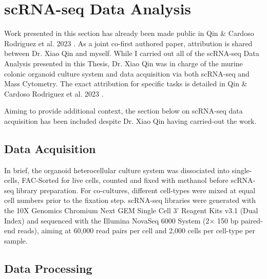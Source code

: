 \newpage
\section{scRNA-seq Data Analysis}

Work presented in this section has already been made public in Qin \& Cardoso Rodriguez et al. 2023 \cite{cardoso_rodriguez_single-cell_2023}. As a joint co-first authored paper, attribution is shared between Dr. Xiao Qin and myself. While I carried out all of the scRNA-seq Data Analysis presented in this Thesis, Dr. Xiao Qin was in charge of the murine colonic organoid culture system and data acquisition via both scRNA-seq and Mass Cytometry. The exact attribution for specific tasks is detailed in Qin \& Cardoso Rodriguez et al. 2023 \cite{cardoso_rodriguez_single-cell_2023}. 

Aiming to provide additional context, the section below on scRNA-seq data acquisition has been included despite Dr. Xiao Qin having carried-out the work.





\subsection{Data Acquisition}

In brief, the organoid heterocellular culture system was dissociated into single-cells, FAC-Sorted for live cells, counted and fixed with methanol before scRNA-seq library preparation. For co-cultures, different cell-types were mixed at equal cell numbers prior to the fixation step. scRNA-seq libraries were generated with the 10X Genomics Chromium Next GEM Single Cell 3' Reagent Kits v3.1 (Dual Index) and sequenced with the Illumina NovaSeq 6000 System (2$\times$ 150 bp paired-end reads), aiming at 60,000 read pairs per cell and 2,000 cells per cell-type per sample.

\subsection{Data Processing}

